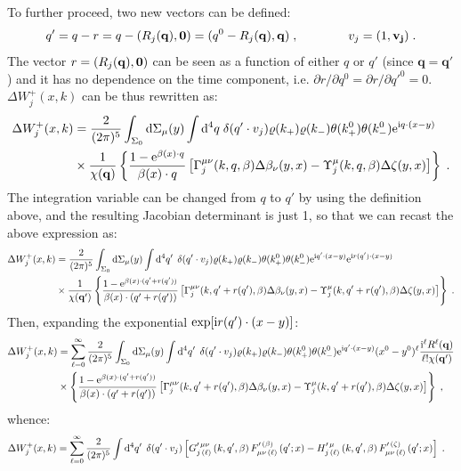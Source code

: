 \documentclass[prd,superscriptaddress,nofootinbib,notitlepage]{revtex4-1}
\newcommand{\e}{{\rm e}}
\newcommand{\di}{{\rm d}}
\newcommand{\ii}{{\rm i}}
\newcommand{\q}{{\mathbf{q}}}
\begin{document}
%
To further proceed, two new vectors can be defined:
%
$$
q'=q - r = q - (R_j(\q),{\bf 0}) = (q^0-R_j(\q),\q)\;, \qquad \qquad v_j = (1,{\bf v_j})\;.
$$
%
The vector $r = (R_j(\q),{\bf 0})$ can be seen as a function of either $q$ or $q'$ (since $\q = \q'$) and it has no 
dependence on the time component, i.e. $\partial r/\partial q^0 = \partial r/\partial q'^0 = 0$. $\Delta W^+_j\left(x,k\right)$
can be thus rewritten as:
%
\begin{align*}
\Delta W_{j}^+(x,k) &= \frac{2}{(2\pi)^5} \int_{\Sigma_{0}} \di \Sigma_{\mu}(y) 
\int \di^4 q\; \delta (q' \cdot v_j) \varrho(k_+)\varrho(k_-)\theta(k_+^0)\theta(k_-^0) \e^{\ii q \cdot (x-y)} 
\nonumber\\
& \times \frac{1}{\chi(\q)} \left\{ \frac{1 -\e^{\beta(x)\cdot q}}{\beta(x) \cdot q} \left[ \Gamma_{j}^{\mu\nu}(k,q,\beta)\Delta\beta_\nu(y,x)-\Upsilon_{j}^\mu(k,q,\beta)\Delta\zeta(y,x) \right] \right\}\;. \nonumber \\
\end{align*}
%
The integration variable can be changed from $q$ to $q'$ by using the definition above, and the resulting
Jacobian determinant is just 1, so that we can recast the above expression as:
%
\begin{align*}
\Delta W_{j}^+(x,k) &= \frac{2}{(2\pi)^5} \int_{\Sigma_{0}} \di \Sigma_{\mu}(y) 
\int \di^4 q'\; \, \delta (q' \cdot v_j) \varrho(k_+)\varrho(k_-)\theta(k_+^0)\theta(k_-^0) 
 \e^{\ii q' \cdot (x-y)} \e^{\ii r(q') \cdot (x-y)} \nonumber\\
& \times \frac{1}{\chi(\q')} \left\{ \frac{1 -\e^{\beta(x)\cdot (q'+r(q'))}}{\beta(x) \cdot (q'+r(q'))} 
\left[ \Gamma_{j}^{\mu\nu}(k,q'+r(q'),\beta)\Delta\beta_\nu(y,x)-\Upsilon_{j}^\mu(k,q'+r(q'),\beta)\Delta\zeta(y,x) \right] \right\}\;.
\end{align*}
%
Then, expanding the exponential $\exp[\ii r(q')\cdot (x-y)]$:
%
\begin{align*}
\Delta W_{j}^+(x,k) &= \sum_{\ell=0}^\infty \frac{2}{(2\pi)^5} \int_{\Sigma_{0}} \di \Sigma_{\mu}(y) 
\int \di^4 q'\; \, \delta (q' \cdot v_j) \varrho(k_+)\varrho(k_-)\theta(k_+^0)\theta(k_-^0) 
 \e^{\ii q' \cdot (x-y)}(x^0-y^0)^\ell \frac{\ii^\ell R^\ell(\q)}{\ell! \chi(\q')} \nonumber\\
& \times  \left\{ \frac{1 -\e^{\beta(x)\cdot (q'+r(q'))}}{\beta(x) \cdot (q'+r(q'))} 
\left[ \Gamma_{j}^{\mu\nu}(k,q'+r(q'),\beta)\Delta\beta_\nu(y,x)-\Upsilon_{j}^\mu(k,q'+r(q'),\beta)\Delta\zeta(y,x) \right] \right\}\;,
\end{align*}
%
whence:
%
\begin{align}\label{deltawigjs3}
\Delta W_{j}^+(x,k) &= \sum_{\ell=0}^\infty \frac{2}{(2\pi)^5} 
\int \di^4 q'\; \, \delta (q' \cdot v_j) \left[ G^{\prime\,\mu\nu}_{j\,(\ell)}\left(k,q',\beta\right) F^{\prime\,(\beta)}_{\mu\nu\,(\ell)}\left(q';x\right)-
H_{j\,(\ell)}^{\prime\,\mu}\left(k,q',\beta\right)F^{\prime\,(\zeta)}_{\mu\nu\,(\ell)}\left(q';x\right) \right]\;. 
\end{align}
\end{document}
